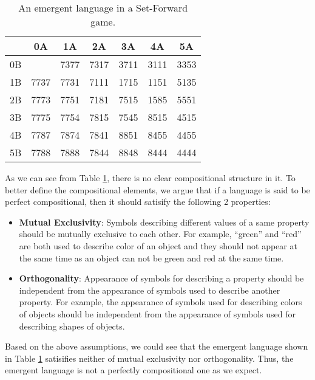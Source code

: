 \begin{table}[!h]
    \centering
    \begin{tabular}{|c|c|c|c|c|c|c|}
        \hline
           & 0A   & 1A   & 2A   & 3A   & 4A   & 5A   \\ \hline
        0B &      & 7377 & 7317 & 3711 & 3111 & 3353 \\ \hline
        1B & 7737 & 7731 & 7111 & 1715 & 1151 & 5135 \\ \hline
        2B & 7773 & 7751 & 7181 & 7515 & 1585 & 5551 \\ \hline
        3B & 7775 & 7754 & 7815 & 7545 & 8515 & 4515 \\ \hline
        4B & 7787 & 7874 & 7841 & 8851 & 8455 & 4455 \\ \hline
        5B & 7788 & 7888 & 7844 & 8848 & 8444 & 4444 \\ \hline
        \end{tabular}
    \caption{An emergent language in a Set-Forward game.}
    \label{tab4.2:emregent_language_generation}
\end{table}

As we can see from Table \ref{tab4.2:emregent_language_generation}, there is no clear compositional structure in it. To better define the compositional elements, we argue that if a language is said to be perfect compositional, then it should satisify the following 2 properties:

\begin{itemize}
    \item \textbf{Mutual Exclusivity}: Symbols describing different values of a same property should be mutually exclusive to each other. For example, ``green'' and ``red'' are both used to describe color of an object and they should not appear at the same time as an object can not be green and red at the same time.
    \item \textbf{Orthogonality}: Appearance of symbols for describing a property should be independent from the appearance of symbols used to describe another property. For example, the appearance of symbols used for describing colors of objects should be independent from the appearance of symbols used for describing shapes of objects.
\end{itemize}

Based on the above assumptions, we could see that the emergent language shown in Table \ref{tab4.2:emregent_language_generation} satisifies neither of mutual exclusivity nor orthogonality. Thus, the emergent language is not a perfectly compositional one as we expect.


